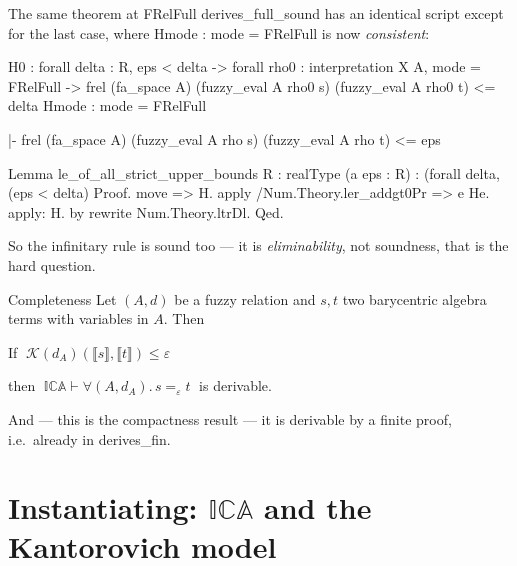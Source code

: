 \documentclass[10pt,aspectratio=169]{beamer}
\newcommand{\qeq}[1]{=_{#1}}
\newcommand{\den}[1]{\llbracket #1 \rrbracket}
\newcommand{\ICA}{\mathbb{I}\mathbb{C}\mathbb{A}}
\newcommand{\eps}{\varepsilon}
\newcommand{\Kan}{\mathcal{K}}
\newcommand{\rid}[1]{{\ttfamily\small #1}}
\begin{document}
\begin{frame}[fragile]{The same theorem at \rid{FRelFull}}
  \rid{derives\_full\_sound} has an identical script except for the
  last case, where \rid{Hmode : mode = FRelFull} is now
  \emph{consistent}:
  \begin{goalbox}[title={\texttt{derives\_full\_sound}, Goal 12/12}]
\begin{gctx}
H0 : forall delta : R, eps < delta -> forall rho0 : interpretation X A,
     mode = FRelFull ->
     frel (fa_space A) (fuzzy_eval A rho0 s) (fuzzy_eval A rho0 t) <= delta
Hmode : mode = FRelFull
\end{gctx}
\tcblower
\begin{gconc}
|- frel (fa_space A) (fuzzy_eval A rho s) (fuzzy_eval A rho t) <= eps
\end{gconc}
  \end{goalbox}
  \begin{srcbox}
Lemma le_of_all_strict_upper_bounds {R : realType} (a eps : R) :
  (forall delta, (eps < delta)%
Proof.
  move => H. apply /Num.Theory.ler_addgt0Pr => e He.
  apply: H. by rewrite Num.Theory.ltrDl.
Qed.
  \end{srcbox}
  \vfill
  So the infinitary rule is sound too --- it is \emph{eliminability},
  not soundness, that is the hard question.
\end{frame}

\begin{frame}{Completeness}
  Let $(A,d)$ be a fuzzy relation and $s,t$ two barycentric algebra
  terms with variables in $A$. Then
  \vfill
  \begin{block}{}
    If $\;\Kan(d_A)(\den{s},\den{t}) \leq \eps$
    \vspace{0.5em}

    then $\;\ICA \vdash \forall(A,d_A).\, s \qeq{\eps} t\;$ is
    derivable.
  \end{block}
  \vfill
  \pause
  {\small And --- this is the compactness result --- it is derivable
  by a finite proof, i.e.\ already in
  \rid{derives\_fin}.}
\end{frame}

\section{Instantiating: $\ICA$ and the Kantorovich model}
\end{document}

